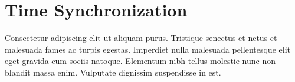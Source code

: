 \section{Time Synchronization}
\label{sec:timesync}

Consectetur adipiscing elit ut aliquam purus. Tristique senectus et netus et malesuada fames ac turpis egestas. Imperdiet nulla malesuada pellentesque elit eget gravida cum sociis natoque. Elementum nibh tellus molestie nunc non blandit massa enim. Vulputate dignissim suspendisse in est.
